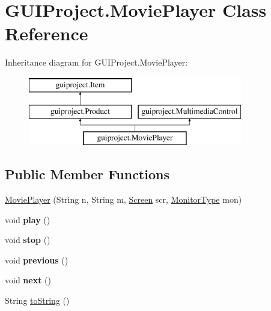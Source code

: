 \hypertarget{class_g_u_i_project_1_1_movie_player}{}\section{G\+U\+I\+Project.\+Movie\+Player Class Reference}
\label{class_g_u_i_project_1_1_movie_player}
Inheritance diagram for G\+U\+I\+Project.\+Movie\+Player\+:\begin{figure}[H]
\begin{center}
\leavevmode
\includegraphics[height=3.000000cm]{class_g_u_i_project_1_1_movie_player}
\end{center}
\end{figure}
\subsection*{Public Member Functions}
\begin{DoxyCompactItemize}
\item 
\mbox{\hyperlink{class_g_u_i_project_1_1_movie_player_a7bdde845fd6ceaaca37258aa4cecfb03}{Movie\+Player}} (String n, String m, \mbox{\hyperlink{class_g_u_i_project_1_1_screen}{Screen}} scr, \mbox{\hyperlink{enum_g_u_i_project_1_1_monitor_type}{Monitor\+Type}} mon)
\item 
\mbox{\label{class_g_u_i_project_1_1_movie_player_a21c557a97b7803399993f7cea478ce34}} 
void {\bfseries play} ()
\item 
\mbox{\label{class_g_u_i_project_1_1_movie_player_a3edf0520959f0e69ac30e702fdadf23b}} 
void {\bfseries stop} ()
\item 
\mbox{\label{class_g_u_i_project_1_1_movie_player_a1ef46fc454e931e1026669b4bcd434cf}} 
void {\bfseries previous} ()
\item 
\mbox{\label{class_g_u_i_project_1_1_movie_player_a3fa022634b5adc471437c974e826af32}} 
void {\bfseries next} ()
\item 
String \mbox{\hyperlink{class_g_u_i_project_1_1_movie_player_a58b4ec001538925e955ac6d87824bd43}{to\+String}} ()
\end{DoxyCompactItemize}
